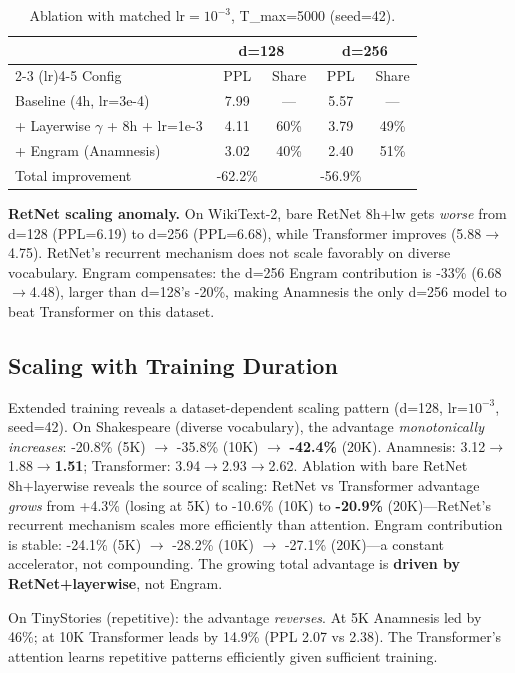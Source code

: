 \documentclass[twocolumn]{article}
\begin{document}
\begin{table}[h]
\centering
\caption{Ablation with matched lr$=10^{-3}$, T\_max=5000 (seed=42).}
\begin{tabular}{lcccc}
\toprule
& \multicolumn{2}{c}{d=128} & \multicolumn{2}{c}{d=256} \\
\cmidrule(lr){2-3} \cmidrule(lr){4-5}
Config & PPL & Share & PPL & Share \\
\midrule
Baseline (4h, lr=3e-4) & 7.99 & — & 5.57 & — \\
+ Layerwise $\gamma$ + 8h + lr=1e-3 & 4.11 & 60\% & 3.79 & 49\% \\
+ Engram (Anamnesis) & 3.02 & 40\% & 2.40 & 51\% \\
\midrule
Total improvement & -62.2\% & & -56.9\% & \\
\bottomrule
\end{tabular}
\end{table}

\textbf{RetNet scaling anomaly.} On WikiText-2, bare RetNet 8h+lw gets \emph{worse} from d=128 (PPL=6.19) to d=256 (PPL=6.68), while Transformer improves (5.88$\to$4.75). RetNet's recurrent mechanism does not scale favorably on diverse vocabulary. Engram compensates: the d=256 Engram contribution is -33\% (6.68$\to$4.48), larger than d=128's -20\%, making Anamnesis the only d=256 model to beat Transformer on this dataset.

\subsection{Scaling with Training Duration}

Extended training reveals a dataset-dependent scaling pattern (d=128, lr=$10^{-3}$, seed=42).
On Shakespeare (diverse vocabulary), the advantage \emph{monotonically increases}: -20.8\% (5K) $\to$ -35.8\% (10K) $\to$ \textbf{-42.4\%} (20K). Anamnesis: 3.12$\to$1.88$\to$\textbf{1.51}; Transformer: 3.94$\to$2.93$\to$2.62. Ablation with bare RetNet 8h+layerwise reveals the source of scaling: RetNet vs Transformer advantage \emph{grows} from +4.3\% (losing at 5K) to -10.6\% (10K) to \textbf{-20.9\%} (20K)---RetNet's recurrent mechanism scales more efficiently than attention. Engram contribution is stable: -24.1\% (5K) $\to$ -28.2\% (10K) $\to$ -27.1\% (20K)---a constant accelerator, not compounding. The growing total advantage is \textbf{driven by RetNet+layerwise}, not Engram.

On TinyStories (repetitive): the advantage \emph{reverses}. At 5K Anamnesis led by 46\%; at 10K Transformer leads by 14.9\% (PPL 2.07 vs 2.38). The Transformer's attention learns repetitive patterns efficiently given sufficient training.
\end{document}
